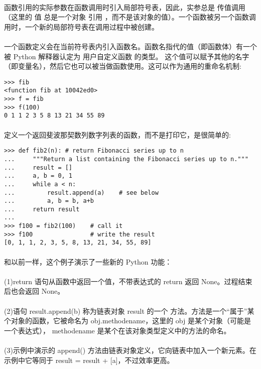 \documentclass{article}
\begin{document}
\begin{CJK}{UTF8}{gbsn}
\paragraph{}
函数引用的实际参数在函数调用时引入局部符号表，因此，实参总是 传值调用 （这里的 值 总是一个对象 引用 ，而不是该对象的值）。一个函数被另一个函数调用时，一个新的局部符号表在调用过程中被创建。
\paragraph{}
一个函数定义会在当前符号表内引入函数名。函数名指代的值（即函数体）有一个被 Python 解释器认定为 用户自定义函数 的类型。 这个值可以赋予其他的名字（即变量名），然后它也可以被当做函数使用。这可以作为通用的重命名机制:
\begin{verbatim}
>>> fib
<function fib at 10042ed0>
>>> f = fib
>>> f(100)
0 1 1 2 3 5 8 13 21 34 55 89
\end{verbatim}
\paragraph{}
定义一个返回斐波那契数列数字列表的函数，而不是打印它，是很简单的:
\begin{verbatim}
>>> def fib2(n): # return Fibonacci series up to n
...     """Return a list containing the Fibonacci series up to n."""
...     result = []
...     a, b = 0, 1
...     while a < n:
...         result.append(a)    # see below
...         a, b = b, a+b
...     return result
...
>>> f100 = fib2(100)    # call it
>>> f100                # write the result
[0, 1, 1, 2, 3, 5, 8, 13, 21, 34, 55, 89]
\end{verbatim}
\paragraph{}
和以前一样，这个例子演示了一些新的 Python 功能：
\paragraph{}
(1)return 语句从函数中返回一个值，不带表达式的 return 返回 None。过程结束后也会返回 None。
\paragraph{}
(2)语句 result.append(b) 称为链表对象 result 的一个 方法。方法是一个“属于”某个对象的函数，它被命名为 obj.methodename，这里的 obj 是某个对象（可能是一个表达式）， methodename 是某个在该对象类型定义中的方法的命名。
\paragraph{}
(3)示例中演示的 append() 方法由链表对象定义，它向链表中加入一个新元素。在示例中它等同于 result = result + [a]，不过效率更高。

\end{CJK}
\end{document}
